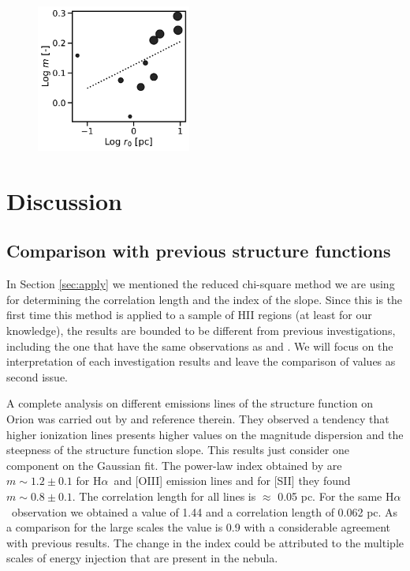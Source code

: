 \documentclass[fleqn,usenatbib, useAMS, a4paper]{mnras}
\newcommand\halpha{H${\alpha}$}
\begin{document}
\begin{figure}
\centering 
\includegraphics[width=2in]{Figures/mr0.pdf}
\caption{ }
\label{fig:mr0}
\end{figure}



\section{Discussion}\label{sec:discussion}

\subsection{Comparison with previous structure functions}

In Section \ref{sec:apply} we mentioned the reduced chi-square method we are using for determining the correlation length and the index of the slope. Since this is the first time this method is applied to a sample of HII regions (at least for our knowledge), the results are bounded to be different from previous investigations, including the one that have the same observations as \citet{arthur2016turbulence} and \citet{2019arXiv191203543M}. We will focus on the interpretation of each investigation results and leave the comparison of values as second issue.

A complete analysis on different emissions lines of the structure function on Orion was carried out by \citet{arthur2016turbulence} and reference therein. 
They observed a tendency that higher ionization lines presents higher values on the magnitude dispersion and the steepness of the structure function slope. 
This results just consider one component on the Gaussian fit. 
The power-law index obtained by \citet{arthur2016turbulence} are \(m \sim 1.2 \pm 0.1\) for \halpha\ and [OIII] emission lines and for [SII] they found \(m \sim 0.8 \pm 0.1\). 
The correlation length for all lines is \(\approx\) 0.05 pc. For the same \halpha\ observation we obtained a value of 1.44 and a correlation length of 0.062 pc. 
As a comparison for the large scales \citep{1987A&A...176..347H} the value is 0.9 with a considerable agreement with previous results. 
The change in the index could be attributed to the multiple scales of energy injection that are present in the nebula.
\end{document}
